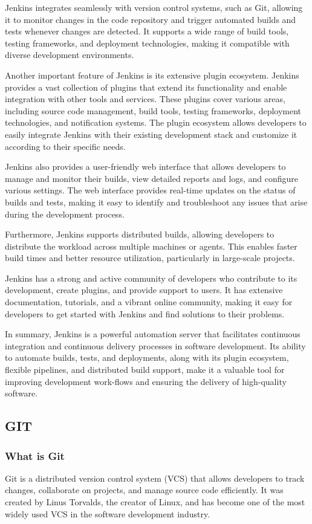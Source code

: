 \documentclass[
12pt,
oneside, 
onehalfspacing, 
nolistspacing, 
parskip, 
chapterinoneline, 
]{AASTCOMPUTER}
\begin{document}
Jenkins integrates seamlessly with version control systems, such as Git, allowing it to monitor changes in the code repository and trigger automated builds and tests whenever changes are detected. It supports a wide range of build tools, testing frameworks, and deployment technologies, making it compatible with diverse development environments.

Another important feature of Jenkins is its extensive plugin ecosystem. Jenkins provides a vast collection of plugins that extend its functionality and enable integration with other tools and services. These plugins cover various areas, including source code management, build tools, testing frameworks, deployment technologies, and notification systems. The plugin ecosystem allows developers to easily integrate Jenkins with their existing development stack and customize it according to their specific needs.

Jenkins also provides a user-friendly web interface that allows developers to manage and monitor their builds, view detailed reports and logs, and configure various settings. The web interface provides real-time updates on the status of builds and tests, making it easy to identify and troubleshoot any issues that arise during the development process.

Furthermore, Jenkins supports distributed builds, allowing developers to distribute the workload across multiple machines or agents. This enables faster build times and better resource utilization, particularly in large-scale projects.

Jenkins has a strong and active community of developers who contribute to its development, create plugins, and provide support to users. It has extensive documentation, tutorials, and a vibrant online community, making it easy for developers to get started with Jenkins and find solutions to their problems.

In summary, Jenkins is a powerful automation server that facilitates continuous integration and continuous delivery processes in software development. Its ability to automate builds, tests, and deployments, along with its plugin ecosystem, flexible pipelines, and distributed build support, make it a valuable tool for improving development work-flows and ensuring the delivery of high-quality software.
\newpage
\subsection{GIT}

\subsubsection{What is Git}
Git is a distributed version control system (VCS) that allows developers to track changes, collaborate on projects, and manage source code efficiently. It was created by Linus Torvalds, the creator of Linux, and has become one of the most widely used VCS in the software development industry.
\end{document}
